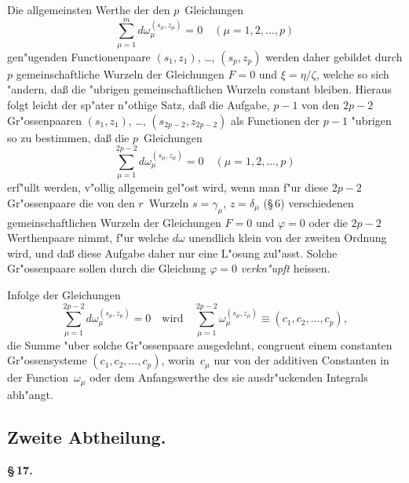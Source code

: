 \documentclass[12pt,a4paper]{article}
\begin{document}
Die allgemeinsten Werthe der den $p$~Gleichungen
\[
\sum_{\mu=1}^{m} d\omega_\mu^{(s_\mu,z_\mu)} = 0
\quad (\mu = 1, 2, \ldots, p)
\]
gen"ugenden Functionenpaare $(s_1,z_1)$, \ldots, $(s_p,z_p)$ werden daher
gebildet durch $p$ gemeinschaftliche Wurzeln der Gleichungen $F = 0$ und
$\xi = \eta/\zeta$, welche so sich "andern, da\ss{} die "ubrigen gemeinschaftlichen
Wurzeln constant bleiben. Hieraus folgt leicht der sp"ater n"othige Satz,
da\ss{} die Aufgabe, $p - 1$ von den $2p - 2$ Gr"ossenpaaren $(s_1,z_1)$,
\ldots, $(s_{2p-2}, z_{2p-2})$ als Functionen der $p - 1$ "ubrigen so zu bestimmen,
da\ss{} die $p$~Gleichungen
\[
\sum_{\mu=1}^{2p-2} d\omega_\mu^{(s_\mu,z_\mu)} = 0
\quad (\mu = 1, 2, \ldots, p)
\]
erf"ullt werden, v"ollig allgemein gel"ost wird, wenn man f"ur diese
$2p - 2$ Gr"ossenpaare die von den $r$~Wurzeln $s = \gamma_\mu$, $z = \delta_\mu$
(\S\,6) verschiedenen gemeinschaftlichen Wurzeln der Gleichungen $F = 0$
und $\varphi = 0$ oder die $2p - 2$ Werthenpaare nimmt, f"ur welche $d\omega$
unendlich klein von der zweiten Ordnung wird, und da\ss{} diese Aufgabe
daher nur eine L"osung zul"asst. Solche Gr"ossenpaare sollen durch die
Gleichung $\varphi = 0$ \emph{verkn"upft} heissen.

Infolge der Gleichungen
\[
\sum_{\mu=1}^{2p-2} d\omega_\mu^{(s_\mu,z_\mu)} = 0
\quad\text{wird}\quad
\sum_{\mu=1}^{2p-2} \omega_\mu^{(s_\mu,z_\mu)} \equiv (c_1, c_2, \ldots, c_p),
\]
die Summe "uber solche Gr"ossenpaare ausgedehnt, congruent einem
constanten Gr"ossensysteme $(c_1, c_2, \ldots, c_p)$, worin~$c_\mu$ nur von der
additiven Constanten in der Function~$\omega_\mu$ oder dem Anfangswerthe des
sie ausdr"uckenden Integrals abh"angt.

\newpage
\subsection*{Zweite Abtheilung.}

\medskip
\textbf{\S\,17.}
\end{document}
